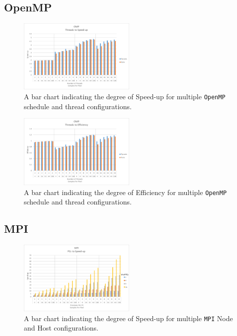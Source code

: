 \documentclass[journal,transmag]{IEEEtran}
\begin{document}
	\subsection{OpenMP}
		\lipsum[4]
		\begin{figure}[ht]
			\centering
			\includegraphics[width = 0.5\textwidth]{chartOMPSpeed}
			\caption{A bar chart indicating the degree of Speed-up for multiple \texttt{OpenMP} schedule and thread configurations.}
			\label{fig_omp_speed}
		\end{figure}
		
		\begin{figure}[ht]
			\centering
			\includegraphics[width = 0.5\textwidth]{chartOMPEff}
			\caption{A bar chart indicating the degree of Efficiency for multiple \texttt{OpenMP} schedule and thread configurations.}
			\label{fig_omp_eff}
		\end{figure}
		
	\subsection{MPI}
		\lipsum[5]
		\begin{figure}[ht]
			\centering
			\includegraphics[width = 0.5\textwidth]{chartMPISpeed}
			\caption{A bar chart indicating the degree of Speed-up for multiple \texttt{MPI} Node and Host configurations.}
			\label{fig_mpi_speed}
		\end{figure}
		
\end{document}
